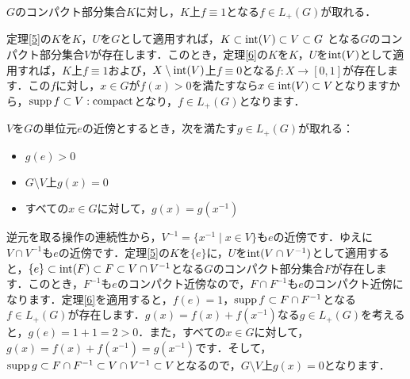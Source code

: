 \begin{ylem}\label{14}
$G$のコンパクト部分集合$K$に対し，$K$上$f \equiv 1$となる$f \in L_{+}(G)$が取れる．
\end{ylem}
\begin{Proof}
定理\ref{5}の$K$を$K$，$U$を$G$として適用すれば，$K \subset \operatorname{int}(V) \subset V \subset G$ となる$G$のコンパクト部分集合$V$が存在します．このとき，定理\ref{6}の$K$を$K$，$U$を$\operatorname{int}(V)$として適用すれば，$K$上$f \equiv 1$および，$X \setminus \operatorname{int}(V)$上$f \equiv 0$となる$f : X \to [0, 1]$が存在します．この$f$に対し，$x \in G$が$f(x)>0$を満たすなら$x \in \operatorname{int}(V) \subset V$となりますから，$\operatorname{supp} f \subset V : \mathrm{compact}$となり，$f \in L_{+}(G)$となります．
\end{Proof}
\begin{ylem}\label{15}
$V$を$G$の単位元$e$の近傍とするとき，次を満たす$g \in L_{+}(G)$が取れる：
\begin{itemize}
 \item $g(e)>0$
 \item $G \setminus V$上$g(x)=0$
 \item すべての$x \in G$に対して，$g(x)=g(x^{-1})$
\end{itemize}
\end{ylem}
\begin{Proof}
逆元を取る操作の連続性から，$V^{-1}=\{ x^{-1} \mid x \in V \}$も$e$の近傍です．ゆえに$V \cap V^{-1}$も$e$の近傍です．定理\ref{5}の$K$を$\{e\}$に，$U$を$\operatorname{int}(V \cap V^{-1})$として適用すると，$\{e\} \subset \operatorname{int}(F) \subset F \subset V \cap V^{-1}$となる$G$のコンパクト部分集合$F$が存在します．このとき，$F^{-1}$も$e$のコンパクト近傍なので，$F \cap F^{-1}$も$e$のコンパクト近傍になります．定理\ref{6}を適用すると，$f(e)=1$，$\operatorname{supp} f \subset F \cap F^{-1}$となる$f \in L_{+}(G)$が存在します．$g(x)=f(x)+f(x^{-1})$なる$g \in L_{+}(G)$を考えると，$g(e)=1+1=2>0$．また，すべての$x \in G$に対して，$g(x)=f(x)+f(x^{-1})=g(x^{-1})$です．そして，$\operatorname{supp} g \subset F \cap F^{-1} \subset V \cap V^{-1} \subset V$となるので，$G \setminus V$上$g(x)=0$となります．　
\end{Proof}

